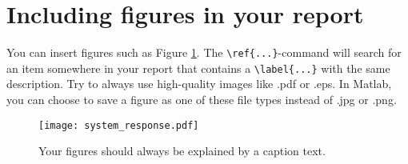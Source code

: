 
\section{Including figures in your report}


You can insert figures such as Figure \ref{fig:intro_system}. The \verb|\ref{...}|-command will search for an item somewhere in your report that contains a \verb|\label{...}| with the same description. Try to always use high-quality images like .pdf or .eps. In Matlab, you can choose to save a figure as one of these file types instead of .jpg or .png.


\begin{figure}[H] %
		\texttt{[image: system\_response.pdf]}
		\centering
		\caption{Your figures should always be explained by a caption text.}
		\label{fig:intro_system}
\end{figure}

